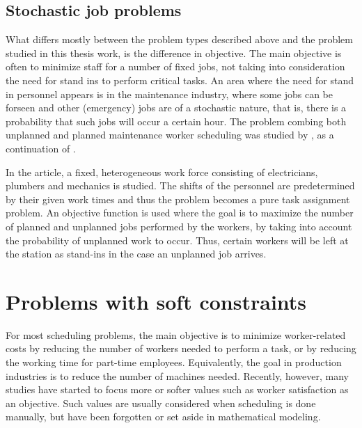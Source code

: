 %


\subsection{Stochastic job problems}
What differs mostly between the problem types described above and the problem studied in this thesis work, is the difference in objective. The main objective is often to minimize staff for a number of fixed jobs, not taking into consideration the need for stand ins to perform critical tasks. An area where the need for stand in personnel appears is in the  maintenance industry, where some jobs can be forseen and other (emergency) jobs are of a stochastic nature, that is, there is a probability that such jobs will occur a certain hour. The problem combing both unplanned and planned maintenance worker scheduling was studied by \citet{duffuaa_1999}, as a continuation of \citet{roberts_1983}. 

In the article, a fixed, heterogeneous work force consisting of electricians, plumbers and mechanics is studied. The shifts of the personnel are predetermined by their given work times and thus the problem becomes a pure task assignment problem. An objective function is used where the goal is to maximize the number of planned and unplanned jobs performed by the workers, by taking into account the probability of unplanned work to occur. Thus, certain workers will be left at the station as stand-ins in the case an unplanned job arrives.


\section{Problems with soft constraints} \label{WLA}
For most scheduling problems, the main objective is to minimize worker-related costs by reducing the number of workers needed to perform a task, or by reducing the working time for part-time employees. Equivalently, the goal in production industries is to reduce the number of machines needed. Recently, however, many studies have started to focus more or softer values such as worker satisfaction as an objective. Such values are usually considered when scheduling is done manually, but have been forgotten or set aside in mathematical modeling.

